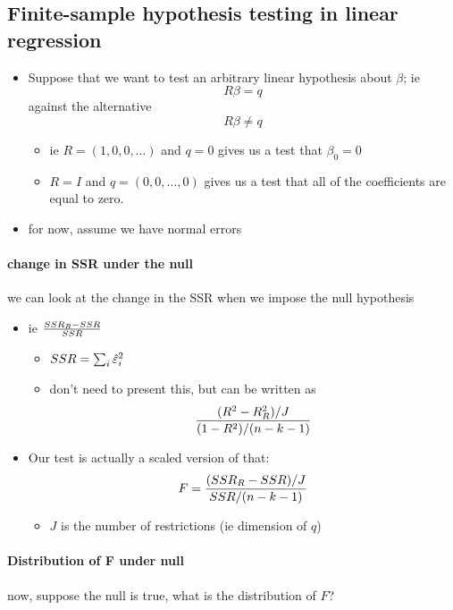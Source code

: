 \subsection{Finite-sample hypothesis testing in linear regression}

\begin{itemize}

\item Suppose that we want to test an arbitrary linear hypothesis about
  $\beta$; ie \[R \beta = q\] against the alternative \[R \beta \neq q\]
\begin{itemize}
\item ie $R = (1, 0, 0, ...)$ and $q=0$ gives us a test that $\beta_0=0$
\item $R = I$ and $q = (0,0,...,0)$ gives us a test that all of the
         coefficients are equal to zero.
\end{itemize}
\item for now, assume we have normal errors
\end{itemize}

\paragraph{change in SSR under the null}
      we can look at the change in the SSR when we impose the null
        hypothesis
\begin{itemize}
\item ie ${SSR_R - SSR \over SSR}$
\begin{itemize}
\item $SSR = \sum_i \hat{\varepsilon}^2_i$
\item don't need to present this, but can be written as \[
  {(R^2 - R^2_R) / J \over (1-R^2) / (n-k-1)} \]
\end{itemize}
\item Our test is actually a scaled version of that:
  \[ F = {(SSR_R - SSR)/J \over SSR / (n-k-1)} \]
\begin{itemize}
\item $J$ is the number of restrictions (ie dimension of $q$)
\end{itemize}
\end{itemize}

\paragraph{Distribution of F under null}
      now, suppose the null is true, what is the distribution of $F$?

